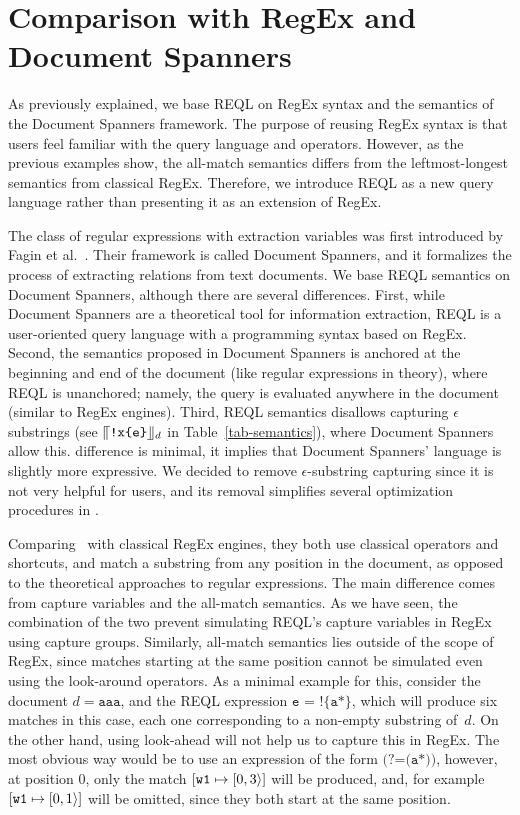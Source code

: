 \section{Comparison with RegEx and Document Spanners} 
As previously explained, we base REQL on RegEx syntax and the semantics of the
Document Spanners framework. The purpose of reusing RegEx syntax is that users
feel familiar with the query language and operators. However, as the previous
examples show, the all-match semantics differs from the leftmost-longest
semantics from classical RegEx. Therefore, we introduce REQL as a new query
language rather than presenting it as an extension of RegEx. 

The class of regular expressions with extraction variables was first introduced
by Fagin et al.~\citep{FaginKRV15}. Their framework is called Document Spanners,
and it formalizes the process of extracting relations from text documents. We
base REQL semantics on Document Spanners, although there are several
differences. First, while Document Spanners are a theoretical tool for
information extraction, REQL is a user-oriented query language with a
programming syntax based on RegEx. Second, the semantics proposed in Document
Spanners is anchored at the beginning and end of the document (like regular
expressions in theory), where REQL is unanchored; namely, the query is evaluated
anywhere in the document (similar to RegEx engines). Third, REQL semantics
disallows capturing $\epsilon$ substrings (see $\llceil{\texttt{!x\{e\}}}\rrfloor_{d}$ in
Table~\ref{tab-semantics}), where Document Spanners allow this. %
difference is minimal, it implies that Document Spanners' language is slightly
more expressive. 
We decided to remove $\epsilon$-substring capturing since it is not very helpful
for users, and its removal simplifies several optimization procedures in
\rematch.

Comparing \rematch\ with classical RegEx engines, they both use classical
operators and shortcuts, and  match a substring from any position in the
document, as opposed to the theoretical approaches to regular expressions. The
main difference comes from capture variables and the all-match semantics. As we
have seen, the combination of the two prevent simulating REQL's capture
variables in RegEx using capture groups. Similarly, all-match semantics lies
outside of the scope of RegEx, since matches starting at the same position
cannot be simulated even using the look-around operators. As a minimal example
for this, consider the document $d = \texttt{aaa}$, and the REQL expression
$\texttt{e = !\{a*\}}$, which will produce six matches in this case, each one
corresponding to a non-empty substring of~$d$. On the other hand, using
look-ahead will not help us to capture this in RegEx. The most obvious way would
be to use an expression of the form $\texttt{(?=(a*))}$, however, at position 0,
only the match $[\texttt{w1} \mapsto [0, 3\rangle]$ will be produced, and, for
example $[\texttt{w1} \mapsto [0, 1\rangle]$ will be omitted, since they both
start at the same position.

